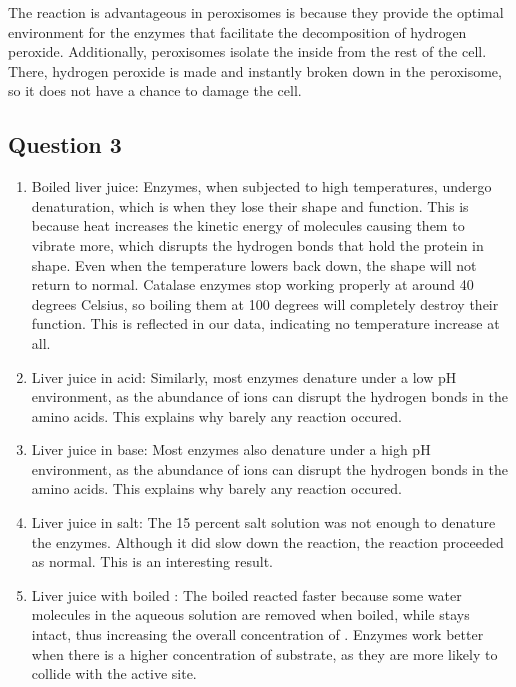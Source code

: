 \documentclass[12pt]{article}
\begin{document}
\begin{enumAlph}
    \item The reaction is advantageous in peroxisomes is because they provide
    the optimal environment for the enzymes that 
    facilitate the decomposition of hydrogen peroxide. Additionally, peroxisomes isolate 
    the inside from the rest of the cell. There, hydrogen peroxide is
    made and instantly broken down in the peroxisome, so it does not have a chance to
    damage the cell.

\end{enumAlph}

\subsection*{Question 3}
\begin{enumAlph}
    \item 
    
    \begin{enumerate}[label=\arabic*.]
        \item Boiled liver juice: Enzymes, when subjected to 
        high temperatures, undergo denaturation, which is
        when they lose their shape and function. This is because heat increases the kinetic energy of molecules
        causing them to vibrate more, which disrupts the hydrogen bonds that
        hold the protein in shape. Even when the temperature lowers back down, 
        the shape will not return to normal. Catalase enzymes stop working properly at
        around 40 degrees Celsius, so boiling them at 100 degrees will completely
        destroy their function. This is reflected in our data, indicating no 
        temperature increase at all. 
        
        \item Liver juice in acid: Similarly, most enzymes denature under
        a low pH environment, as the abundance of  ions can disrupt
        the hydrogen bonds in the amino acids. This explains why barely any reaction
        occured. 

        \item Liver juice in base: Most enzymes also denature under
        a high pH environment, as the abundance of  ions can disrupt
        the hydrogen bonds in the amino acids. This explains why barely any reaction
        occured. 

        \item Liver juice in salt: The 15 percent salt solution was not enough to denature the 
        enzymes. Although it did slow down the reaction, the reaction proceeded 
        as normal. This is an interesting result. 

        \item Liver juice with boiled : The boiled  reacted faster because 
        some water molecules in the aqueous solution are removed when boiled, while 
         stays intact, thus
        increasing the overall concentration of . Enzymes work better when 
        there is a higher concentration of substrate, as they are more likely to collide
        with the active site.

        
    \end{enumerate}
\end{enumAlph}
\end{document}
